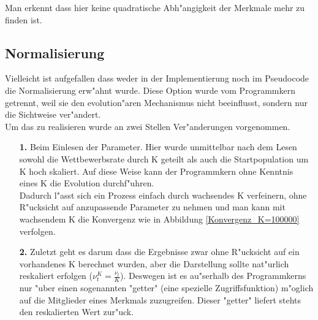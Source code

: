 \documentclass[11pt, a4paper, german]{article}
\theoremstyle{plain}
\begin{document}
	Man erkennt dass hier keine quadratische Abh"angigkeit der Merkmale mehr zu finden ist.
	
	\subsection{Normalisierung}
	Vielleicht ist aufgefallen dass weder in der Implementierung noch im Pseudocode die Normalisierung erw"ahnt wurde. Diese Option wurde vom Programmkern getrennt, weil sie den evolution"aren Mechanismus nicht beeinflusst, sondern nur die Sichtweise ver"andert.\\
	Um das zu realisieren wurde an zwei Stellen Ver"anderungen vorgenommen.
	\begin{itemize}
		\item [\textbf{1.}] Beim Einlesen der Parameter. Hier wurde unmittelbar nach dem Lesen sowohl die Wettbewerbsrate durch K geteilt als auch die Startpopulation um K hoch skaliert. Auf diese Weise kann der Programmkern ohne Kenntnis eines K die Evolution durchf"uhren.\\ 
		Dadurch l"asst sich ein Prozess einfach durch wachsendes K verfeinern, ohne R"ucksicht auf anzupassende Parameter zu nehmen und man kann mit wachsendem K die Konvergenz wie in Abbildung \ref{Konvergenz_K=100000} verfolgen.
		\item [\textbf{2.}] Zuletzt geht es darum dass die Ergebnisse zwar ohne R"ucksicht auf ein vorhandenes K berechnet wurden, aber die Darstellung sollte nat"urlich reskaliert erfolgen ($ \nu_t^K = \frac{\nu_t}{K} $). Deswegen ist es au"serhalb des Programmkerns nur "uber einen sogenannten "{}getter"{} (eine spezielle Zugriffsfunktion) m"oglich auf die Mitglieder eines Merkmals zuzugreifen. Dieser "{}getter"{} liefert stehts den reskalierten Wert zur"uck.\\
	\end{itemize}
	
\end{document}
